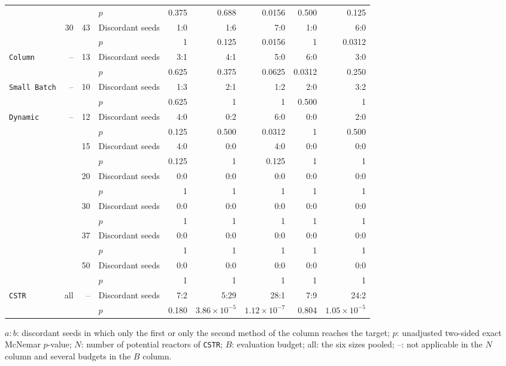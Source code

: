 \begin{table}[htbp]
\begin{threeparttable}
\begin{tabular}{@{}lrrlrrrrr@{}}
 & & & \(p\) & 0.375 & 0.688 & 0.0156 & 0.500 & 0.125 \\
\addlinespace[2pt]
 & \multirow{2}{*}{30} & \multirow{2}{*}{43} & Discordant seeds & 1:0 & 1:6 & 7:0 & 1:0 & 6:0 \\
 & & & \(p\) & 1 & 0.125 & 0.0156 & 1 & 0.0312 \\
\midrule
\multirow{2}{*}{\texttt{Column}} & \multirow{2}{*}{--} & \multirow{2}{*}{13} & Discordant seeds & 3:1 & 4:1 & 5:0 & 6:0 & 3:0 \\
 & & & \(p\) & 0.625 & 0.375 & 0.0625 & 0.0312 & 0.250 \\
\midrule
\multirow{2}{*}{\texttt{Small Batch}} & \multirow{2}{*}{--} & \multirow{2}{*}{10} & Discordant seeds & 1:3 & 2:1 & 1:2 & 2:0 & 3:2 \\
 & & & \(p\) & 0.625 & 1 & 1 & 0.500 & 1 \\
\midrule
\multirow{12}{*}{\texttt{Dynamic}} & \multirow{2}{*}{--} & \multirow{2}{*}{12} & Discordant seeds & 4:0 & 0:2 & 6:0 & 0:0 & 2:0 \\
 & & & \(p\) & 0.125 & 0.500 & 0.0312 & 1 & 0.500 \\
\addlinespace[2pt]
 &  & \multirow{2}{*}{15} & Discordant seeds & 4:0 & 0:0 & 4:0 & 0:0 & 0:0 \\
 & & & \(p\) & 0.125 & 1 & 0.125 & 1 & 1 \\
\addlinespace[2pt]
 &  & \multirow{2}{*}{20} & Discordant seeds & 0:0 & 0:0 & 0:0 & 0:0 & 0:0 \\
 & & & \(p\) & 1 & 1 & 1 & 1 & 1 \\
\addlinespace[2pt]
 &  & \multirow{2}{*}{30} & Discordant seeds & 0:0 & 0:0 & 0:0 & 0:0 & 0:0 \\
 & & & \(p\) & 1 & 1 & 1 & 1 & 1 \\
\addlinespace[2pt]
 &  & \multirow{2}{*}{37} & Discordant seeds & 0:0 & 0:0 & 0:0 & 0:0 & 0:0 \\
 & & & \(p\) & 1 & 1 & 1 & 1 & 1 \\
\addlinespace[2pt]
 &  & \multirow{2}{*}{50} & Discordant seeds & 0:0 & 0:0 & 0:0 & 0:0 & 0:0 \\
 & & & \(p\) & 1 & 1 & 1 & 1 & 1 \\
\midrule
\multirow{2}{*}{\texttt{CSTR}} & \multirow{2}{*}{all} & \multirow{2}{*}{--} & Discordant seeds & 7:2 & 5:29 & 28:1 & 7:9 & 24:2 \\
 & & & \(p\) & 0.180 & \(3.86\times10^{-5}\) & \(1.12\times10^{-7}\) & 0.804 & \(1.05\times10^{-5}\) \\
\bottomrule
\end{tabular}
\begin{tablenotes}[flushleft]\footnotesize
\item \(a{:}b\): discordant seeds in which only the first or only the second method of the column reaches the target; \(p\): unadjusted two-sided exact McNemar \(p\)-value; \(N\): number of potential reactors of \texttt{CSTR}; \(B\): evaluation budget; all: the six sizes pooled; --: not applicable in the \(N\) column and several budgets in the \(B\) column.
\end{tablenotes}
\end{threeparttable}
\end{table}
